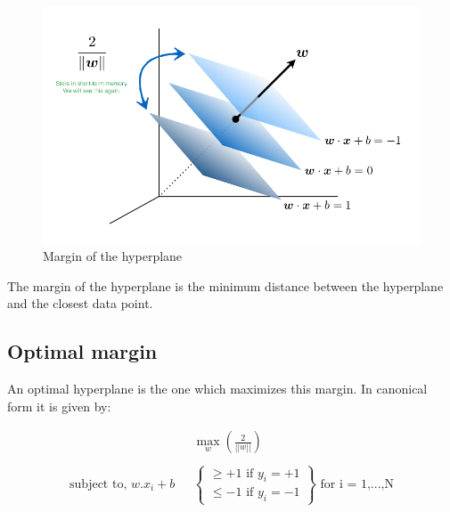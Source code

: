 \documentclass[11pt]{article}
\begin{document}
	\begin{figure}[h!]
    \centering
    \includegraphics[scale=0.3]{images/margin.png}
    \caption{Margin of the hyperplane}
    \label{fig:method}
    \end{figure}
	


The margin of the hyperplane is the minimum distance between the hyperplane and the closest data point. 

\subsection{Optimal margin}
An optimal hyperplane is the one which maximizes this margin. In canonical form it is given by\cite{bishop}:

	\begin{equation}
	\begin{aligned}
	&\max_{w} \left( \frac{2}{||w||}\right)\\
	\\
	\text{subject to, }  w.x_i + b \text{   }
    &\begin{Bmatrix}
    \geq +1 \text{ if } y_i= +1 \\
    \leq -1 \text{ if } y_i = -1 
    \end{Bmatrix}
    \text{  for i = 1,...,N}
	\end{aligned}
	\end{equation}
\end{document}
